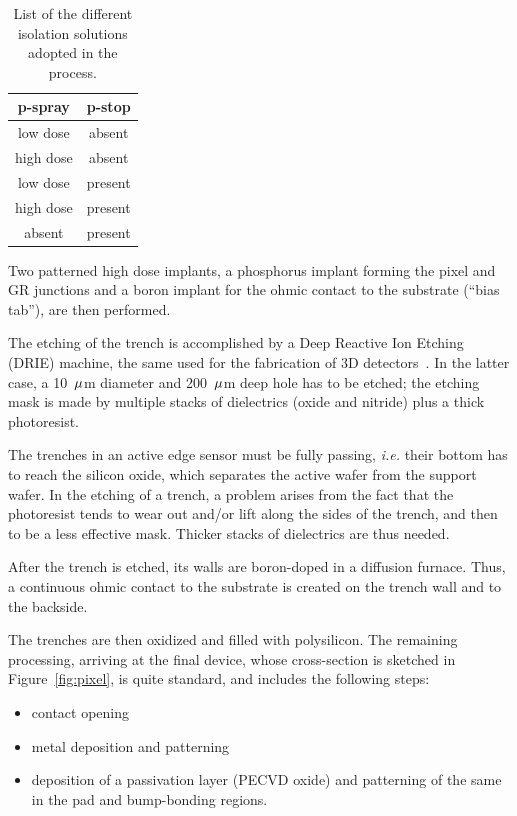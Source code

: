 \begin{table}[!htpb]
\caption{\label{tab:isolation}List of the different isolation solutions adopted in the process.}
\begin{center}
\begin{tabular}{cc}
\hline
p-spray    & p-stop \\
\hline
\hline
  low dose &      absent\\
  high   dose  &   absent\\
  low   dose &     present\\
  high  dose  &   present\\
  absent  &   present
\end{tabular}
\end{center}
\end{table}

Two patterned high dose implants, a  phosphorus implant forming the pixel and GR junctions  and a boron implant for  the ohmic contact
 to the substrate (``bias tab''), are then performed.

The etching of the trench is accomplished by a Deep Reactive Ion Etching (DRIE) machine, the same used for the fabrication of
3D detectors~\cite{bib:3DFBK}.
In the latter case, a 10~${\rm \mu}$m diameter and 200~${\rm \mu}$m deep hole has to be etched; the etching mask is made  by multiple stacks of dielectrics
 (oxide and nitride) plus a thick  photoresist.

The trenches in an active edge sensor must be fully passing, {\it i.e.} their bottom  has to reach  the silicon oxide, which separates the active wafer from the 
support wafer.
In the etching of a trench, a problem arises from the fact that the photoresist tends to wear out and/or lift along the sides  of the trench, and then to be
  a less effective mask. Thicker stacks of dielectrics are thus needed.

After the trench is etched, its walls are boron-doped in a diffusion furnace.
Thus, a continuous ohmic contact to the substrate  is created on the trench wall and to the backside.

The trenches are then oxidized and filled with polysilicon.
The remaining processing, arriving at the final device, whose cross-section is sketched in Figure~\ref{fig:pixel},
is quite standard, and includes the following steps:
\begin{itemize}
\item contact opening
\item metal deposition and patterning
\item deposition of a passivation layer  (PECVD  oxide)  and patterning of the same in the
 pad and bump-bonding regions.
\end{itemize}

